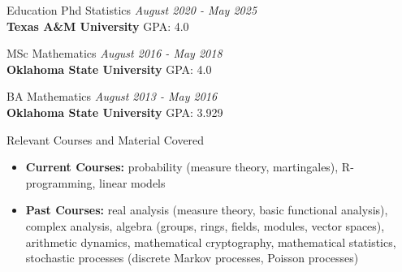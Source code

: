 \documentclass{resume} %
\begin{document}
\begin{rSection}{Education}
Phd Statistics \hfill {\em August 2020 - May 2025} \\
{\bf Texas A\&M University}  \hfill {GPA: 4.0} 

MSc Mathematics \hfill {\em August 2016 - May 2018} \\
{\bf Oklahoma State University}  \hfill {GPA: 4.0} 

BA Mathematics \hfill {\em August 2013 - May 2016} \\
{\bf Oklahoma State University} \hfill {GPA: 3.929} \\
\end{rSection}


\begin{rSection}{Relevant Courses and Material Covered}
\begin{itemize}
\item \textbf{Current Courses:} probability (measure theory, martingales), R-programming, linear models

\item \textbf{Past Courses:} real analysis (measure theory, basic functional analysis),
complex analysis, algebra (groups, rings, fields, modules, vector spaces), arithmetic dynamics,
mathematical cryptography, mathematical statistics, stochastic processes (discrete Markov processes, Poisson processes)
\end{itemize} 
\end{rSection}
\end{document}
